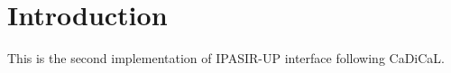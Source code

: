 \chapter{Introduction}

This is the second implementation of IPASIR-UP interface following CaDiCaL.
